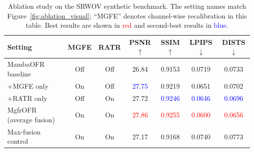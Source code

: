 \documentclass[symmetry,article,submit,pdftex,moreauthors]{Definitions/mdpi}
\DeclareRobustCommand{\bestres}[1]{\textcolor{red}{#1}} %
\DeclareRobustCommand{\secondres}[1]{\textcolor{blue}{#1}} %
\providecommand{\DIFaddbegin}{} %
\providecommand{\DIFaddend}{} %
\providecommand{\DIFdelbegin}{} %
\providecommand{\DIFdelend}{} %
\begin{document}
\DIFdelbegin %
\DIFdelend \DIFaddbegin \begin{table}[htbp]
\scriptsize
\caption{Ablation study on the SRWOV synthetic benchmark. The setting names match Figure~\ref{fig:ablation_visual}; ``MGFE'' denotes channel-wise recalibration in this table. Best results are shown in \bestres{red} and second-best results in \secondres{blue}.\label{tab:ablation}}
\centering
\begin{tabularx}{\textwidth}{>{\raggedright\arraybackslash}XccCCCC}
\toprule
\textbf{Setting} & \textbf{MGFE} & \textbf{RATR} & \textbf{PSNR$\uparrow$} & \textbf{SSIM$\uparrow$} & \textbf{LPIPS$\downarrow$} & \textbf{DISTS$\downarrow$} \\
\midrule
MambaOFR baseline               & Off & Off & 26.84 & 0.9153 & 0.0719 & 0.0733 \\
+MGFE only                      & On  & Off & \secondres{27.75} & 0.9219 & 0.0651 & 0.0702 \\
+RATR only                      & Off & On  & 27.72 & \secondres{0.9246} & \secondres{0.0646} & \secondres{0.0696} \\
MgfrOFR (average fusion)        & On  & On  & \bestres{27.86} & \bestres{0.9255} & \bestres{0.0600} & \bestres{0.0656} \\
Max-fusion control              & On  & On  & 27.17 & 0.9168 & 0.0740 & 0.0773 \\
\bottomrule
\end{tabularx}
\end{table}
\DIFaddend 
\end{document}
